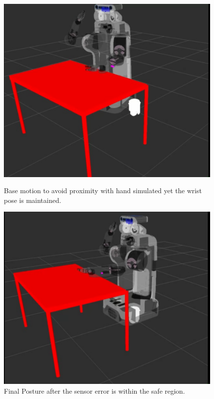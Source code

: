 \begin{figure}[!htb]
  \includegraphics[width=\linewidth]{doa/images/traj8.png}
  \caption{Base motion to avoid proximity with hand simulated yet the wrist pose is maintained.}\label{fig:traj3}
\endminipage
{}%
\vspace{0.13\textwidth}
  \includegraphics[width=\linewidth]{doa/images/traj11.png}
  \caption{Final Posture after the sensor error is within the safe region.}\label{fig:traj4}
\endminipage
\end{figure}
   
